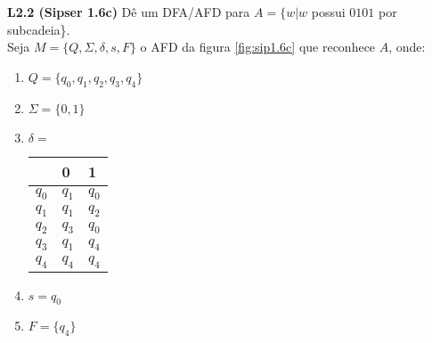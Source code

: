 
\noindent \textbf{L2.2 (Sipser 1.6c)} Dê um DFA/AFD para $A = \{w | w$ possui $0101$ por subcadeia\}.\\[3pt]
Seja $M = \{Q, \Sigma, \delta, s, F\}$ o AFD da figura \ref{fig:sip1.6c} que reconhece $A$, onde:
\begin{enumerate}[label=\textbf{\arabic*}]
    \item $Q = \{q_0, q_1, q_2, q_3, q_4\}$
    \item $\Sigma = \{0, 1\}$
    \item $\delta = $
        \begin{table}[!ht]
        \centering
        \begin{tabular}{l|l|l}
                & 0         & 1     \\ \hline
        $q_0$   & $q_1$     & $q_0$ \\
        $q_1$   & $q_1$     & $q_2$ \\
        $q_2$   & $q_3$     & $q_0$ \\
        $q_3$   & $q_1$     & $q_4$ \\
        $q_4$   & $q_4$     & $q_4$
        \end{tabular}
        \end{table}
    \item $s = q_0$
    \item $F = \{q_4\}$
\end{enumerate}

